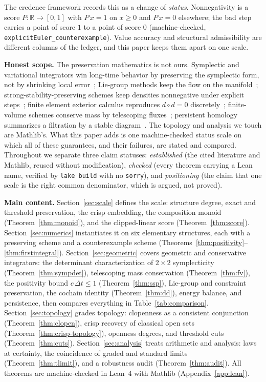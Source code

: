 \documentclass[11pt,a4paper]{article}
\newcommand{\Real}{\mathbb{R}}
\begin{document}
The credence framework records this as a change of \emph{status}.
Nonnegativity is a score $P : \Real \to [0,1]$ with $P\,x = 1$ on
$x \ge 0$ and $P\,x = 0$ elsewhere; the bad step carries a point of
score $1$ to a point of score $0$
(machine-checked, \texttt{explicitEuler\_counterexample}).
Value accuracy and structural admissibility are different columns of
the ledger, and this paper keeps them apart on one scale.

\textbf{Honest scope.}
The preservation mathematics is not ours.
Symplectic and variational integrators win long-time behavior by
preserving the symplectic form, not by shrinking local
error~\cite{hairer2006,marsden2001};
Lie-group methods keep the flow on the
manifold~\cite{iserles2000};
strong-stability-preserving schemes keep densities nonnegative under
explicit steps~\cite{gottlieb2001};
finite element exterior calculus reproduces $d \circ d = 0$
discretely~\cite{arnold2006};
finite-volume schemes conserve mass by telescoping
fluxes~\cite{leveque2002};
persistent homology summarizes a filtration by a stable
diagram~\cite{edelsbrunner2010}.
The topology and analysis we touch are Mathlib's.
What this paper adds is one machine-checked status scale on which all
of these guarantees, and their failures, are stated and compared.
Throughout we separate three claim statuses:
\emph{established} (the cited literature and Mathlib, reused without
modification),
\emph{checked} (every theorem carrying a Lean name, verified by
\texttt{lake build} with no \texttt{sorry}), and
\emph{positioning} (the claim that one scale is the right common
denominator, which is argued, not proved).

\textbf{Main content.}
Section~\ref{sec:scale} defines the scale: structure degree, exact and
threshold preservation, the crisp embedding, the composition monoid
(Theorem~\ref{thm:monoid}), and the clipped-linear score
(Theorem~\ref{thm:score}).
Section~\ref{sec:numerics} instantiates it on six elementary structures,
each with a preserving scheme and a counterexample scheme
(Theorems~\ref{thm:positivity}--\ref{thm:firstintegral}).
Section~\ref{sec:geometric} covers geometric and conservative
integrators: the determinant characterization of $2 \times 2$
symplecticity (Theorem~\ref{thm:sympdet}), telescoping mass
conservation (Theorem~\ref{thm:fv}), the positivity bound
$c\,\Delta t \le 1$ (Theorem~\ref{thm:ssp}), Lie-group and constraint
preservation, the cochain identity (Theorem~\ref{thm:dd}), energy
balance, and persistence, then compares everything in
Table~\ref{tab:comparison}.
Section~\ref{sec:topology} grades topology: clopenness as a consistent
conjunction (Theorem~\ref{thm:clopen}), crisp recovery of classical
open sets (Theorem~\ref{thm:crisp-topology}), openness degrees, and
threshold cuts (Theorem~\ref{thm:cuts}).
Section~\ref{sec:analysis} treats arithmetic and analysis: laws at
certainty, the coincidence of graded and standard limits
(Theorem~\ref{thm:tlimit}), and a robustness audit
(Theorem~\ref{thm:audit}).
All theorems are machine-checked in Lean~4 with Mathlib
(Appendix~\ref{app:lean}).
\end{document}
